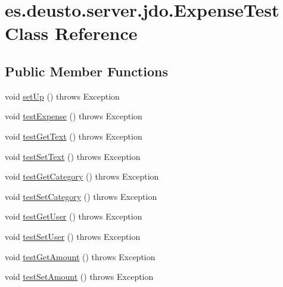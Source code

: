 \hypertarget{classes_1_1deusto_1_1server_1_1jdo_1_1_expense_test}{}\section{es.\+deusto.\+server.\+jdo.\+Expense\+Test Class Reference}
\label{classes_1_1deusto_1_1server_1_1jdo_1_1_expense_test}
\subsection*{Public Member Functions}
\begin{DoxyCompactItemize}
\item 
void \hyperlink{classes_1_1deusto_1_1server_1_1jdo_1_1_expense_test_a6e23388add90f6a9465a6befc55978c2}{set\+Up} ()  throws Exception
\item 
void \hyperlink{classes_1_1deusto_1_1server_1_1jdo_1_1_expense_test_a90db3b35017b6000665199694d7f715d}{test\+Expense} ()  throws Exception 
\item 
void \hyperlink{classes_1_1deusto_1_1server_1_1jdo_1_1_expense_test_a07a19f73b071030eea8864b86e394794}{test\+Get\+Text} ()  throws Exception 
\item 
void \hyperlink{classes_1_1deusto_1_1server_1_1jdo_1_1_expense_test_a766834aa2f51b6aacc54dd13b43b2f6f}{test\+Set\+Text} ()  throws Exception 
\item 
void \hyperlink{classes_1_1deusto_1_1server_1_1jdo_1_1_expense_test_a137a49175ad33ab63b53a6c4d1fc56ae}{test\+Get\+Category} ()  throws Exception 
\item 
void \hyperlink{classes_1_1deusto_1_1server_1_1jdo_1_1_expense_test_aa338c93917012381fe92904b764384b1}{test\+Set\+Category} ()  throws Exception 
\item 
void \hyperlink{classes_1_1deusto_1_1server_1_1jdo_1_1_expense_test_a2b21c0ad0d040cfed79bb52c9123e3d0}{test\+Get\+User} ()  throws Exception 
\item 
void \hyperlink{classes_1_1deusto_1_1server_1_1jdo_1_1_expense_test_a54d2e8a158f8a3d22df5a68074ce4c1e}{test\+Set\+User} ()  throws Exception 
\item 
void \hyperlink{classes_1_1deusto_1_1server_1_1jdo_1_1_expense_test_a18a3c76cb6200e9cbeb2f88a41f7a39c}{test\+Get\+Amount} ()  throws Exception 
\item 
void \hyperlink{classes_1_1deusto_1_1server_1_1jdo_1_1_expense_test_a14edb47f18e79d658398ecba6defbb46}{test\+Set\+Amount} ()  throws Exception 
\end{DoxyCompactItemize}


